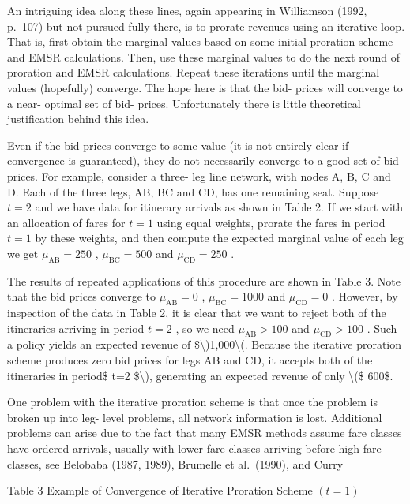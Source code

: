 An intriguing idea along these lines, again appearing in Williamson
(1992, p.~107) but not pursued fully there, is to prorate revenues using
an iterative loop. That is, first obtain the marginal values based on
some initial proration scheme and EMSR calculations. Then, use these
marginal values to do the next round of proration and EMSR calculations.
Repeat these iterations until the marginal values (hopefully) converge.
The hope here is that the bid- prices will converge to a near- optimal
set of bid- prices. Unfortunately there is little theoretical
justification behind this idea.

Even if the bid prices converge to some value (it is not entirely clear
if convergence is guaranteed), they do not necessarily converge to a
good set of bid- prices. For example, consider a three- leg line
network, with nodes A, B, C and D. Each of the three legs, AB, BC and
CD, has one remaining seat. Suppose \(t = 2\) and we have data for
itinerary arrivals as shown in Table 2. If we start with an allocation
of fares for \(t = 1\) using equal weights, prorate the fares in period
\(t = 1\) by these weights, and then compute the expected marginal value
of each leg we get \(\mu_{\mathrm{AB}} = 250\) ,
\(\mu_{\mathrm{BC}} = 500\) and \(\mu_{\mathrm{CD}} = 250\) .

The results of repeated applications of this procedure are shown in
Table 3. Note that the bid prices converge to \(\mu_{\mathrm{AB}} = 0\)
, \(\mu_{\mathrm{BC}} = 1000\) and \(\mu_{\mathrm{CD}} = 0\) . However,
by inspection of the data in Table 2, it is clear that we want to reject
both of the itineraries arriving in period \(t = 2\) , so we need
\(\mu_{\mathrm{AB}} > 100\) and \(\mu_{\mathrm{CD}} > 100\) . Such a
policy yields an expected revenue of
{\$\textbackslash)1,000\textbackslash(. Because the iterative proration
scheme produces zero bid prices for legs AB and CD, it accepts both of
the itineraries in period\$} t=2 {\$\textbackslash), generating an
expected revenue of only \textbackslash(\$} 600\$.

One problem with the iterative proration scheme is that once the problem
is broken up into leg- level problems, all network information is lost.
Additional problems can arise due to the fact that many EMSR methods
assume fare classes have ordered arrivals, usually with lower fare
classes arriving before high fare classes, see Belobaba (1987, 1989),
Brumelle et al.~(1990), and Curry

Table 3 Example of Convergence of Iterative Proration Scheme \((t = 1)\)

